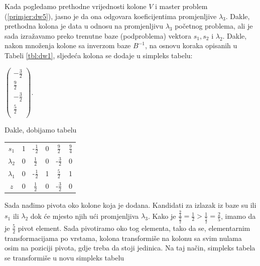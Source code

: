 \documentclass[b5paper, utf8, 11pt, colorlinks]{book}
\theoremstyle{definition}
\begin{document}
Kada pogledamo prethodne vrijednosti kolone $V$ i master problem (\ref{primjer:dw5}), jasno je da ona odgovara koeficijentima promjenljive $\lambda_3$. Dakle, prethodna kolona je data u odnosu na promjenljivu $\lambda_3$ početnog problema, ali je sada izražavamo preko trenutne baze (podproblema) vektora $s_1, s_2$ i $\lambda_2$. Dakle, nakon množenja kolone sa inverzom baze $B^{-1}$, na osnovu koraka opisanih u Tabeli \ref{tbl:dw1}, sljedeća kolona se dodaje u simpleks tabelu:

\begin{center}
 
  $\begin{pmatrix}
	 -\frac{3}{2}            \\
	 \frac{9}{2}     \\
 	-\frac{3}{2}       \\
	 \frac{5}{2}    \\
   \end{pmatrix}$.
\end{center}
Dakle, dobijamo tabelu 

\begin{center}
 
		\begin{tabular}{c|cccc|c}\vspace{1mm}
		   $s_1$	    &   1      &   -$\frac{1}{2}$         &   0         &   $\frac{9}{2}$          &  $\frac{9}{4}$ \\\vspace{1mm}
		   $\lambda_2$  &   0      &    $\frac{1}{2}$         &   0         &  -$ \frac{3}{2}$         &  0             \\\vspace{1mm}
		   $\lambda_1$  &   0      &    -$\frac{1}{2}$        &   1         &  $\frac{5}{2} $          &  1             \\ \hline\vspace{1mm}
		   $z$          &   0      &    $\frac{1}{2}$         &   0         &   -$\frac{3}{2}$       & 0  
	\end{tabular}
 
\end{center} 
Sada nađimo pivota oko kolone koja je dodana. Kandidati za izlazak iz baze su ili $s_1$ ili $\lambda_2$ dok će mjesto njih ući promjenljiva $\lambda_3$. Kako je $\frac{\frac94}{\frac92}=\frac{1}{2} > \frac{1}{\frac52}=\frac{2}{5}$, imamo da je $\frac{5}{2}$ pivot element. Sada pivotiramo oko tog elementa, tako da se, elementarnim transformacijama po vrstama, kolona transformiše  na kolonu sa svim nulama osim na poziciji pivota, gdje treba da stoji jedinica. Na taj način, simpleks tabela se transformiše u novu simpleks tabelu 
\end{document}
